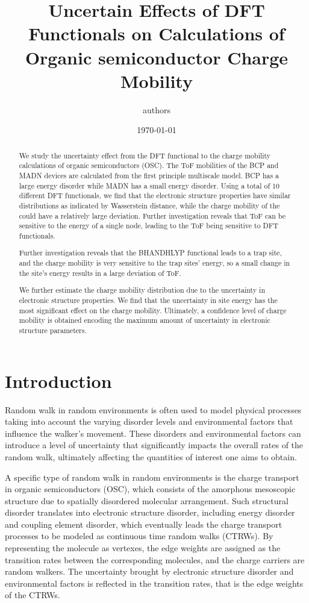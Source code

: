 \documentclass[letterpaper,12pt]{article}
\begin{document}
\linenumbers
\title{Uncertain Effects of DFT Functionals on Calculations of Organic semiconductor Charge Mobility}
\author{authors}
\date{\today}
\maketitle

\begin{abstract}
    We study the uncertainty effect from the DFT functional to the charge mobility calculations of organic semiconductors (OSC). 
    The ToF mobilities of the BCP and MADN devices are calculated from the first principle multiscale model. 
    BCP has a large energy disorder while MADN has a small energy disorder.
    Using a total of 10 different DFT functionals, we find that the electronic structure properties have similar distributions as indicated by Wasserstein distance, while the charge mobility of the could have a relatively large deviation.
    Further investigation reveals that ToF can be sensitive to the energy of a single node, leading to the ToF being sensitive to DFT functionals.
    
    Further investigation reveals that the BHANDHLYP functional leads to a trap site, and the charge mobility is very sensitive to the trap sites' energy, so a small change in the site's energy results in a large deviation of ToF.  

    We further estimate the charge mobility distribution due to the uncertainty in electronic structure properties.  
    We find that the uncertainty in site energy has the most significant effect on the charge mobility. Ultimately, a confidence level of charge mobility is obtained encoding the maximum amount of uncertainty in electronic structure parameters. 
\end{abstract}

\section{Introduction}
Random walk in random environments is often used to model physical processes taking into account the varying disorder levels and environmental factors that influence the walker's movement. 
These disorders and environmental factors can introduce a level of uncertainty that significantly impacts the overall rates of the random walk, ultimately affecting the quantities of interest one aims to obtain.

A specific type of random walk in random environments is the charge transport in organic semiconductors (OSC), which consists of the amorphous mesoscopic structure due to spatially disordered molecular arrangement. 
Such structural disorder translates into electronic structure disorder, including energy disorder and coupling element disorder, which eventually leads the charge transport processes to be modeled as continuous time random walks (CTRWs). By representing the molecule as vertexes, the edge weights are assigned as the transition rates between the corresponding molecules, and the charge carriers are random walkers. 
The uncertainty brought by electronic structure disorder and environmental factors is reflected in the transition rates, that is the edge weights of the CTRWs. 
\end{document}
